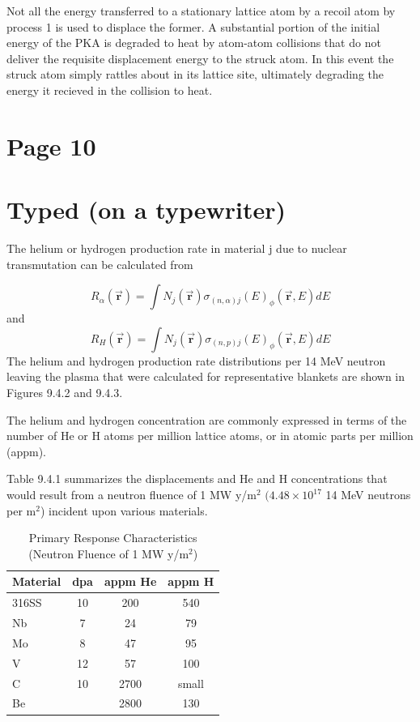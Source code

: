 \documentclass[11pt]{report} %
\begin{document}
Not all the energy transferred to a stationary lattice atom by a recoil atom by process 1 is used to displace the former. A substantial portion of the initial energy of the PKA is degraded to heat by atom-atom collisions that do not deliver the requisite displacement energy to the struck atom. In this event the struck atom simply rattles about in its lattice site, ultimately degrading the energy it recieved in the collision to heat.

\section{Page 10}

\section{Typed (on a typewriter)}

The helium or hydrogen production rate in material j due to nuclear transmutation can be calculated from

\begin{equation}
	R_{\alpha}(\vec{\mathbf{r}}) = \int N_j(\vec{\mathbf{r}}) \sigma_{(n,\alpha)j}(E)_{\phi}(\vec{\mathbf{r}},E) dE
\end{equation}
and
\begin{equation}
	R_{H}(\vec{\mathbf{r}}) = \int N_j(\vec{\mathbf{r}}) \sigma_{(n,p)j}(E)_{\phi}(\vec{\mathbf{r}},E) dE
\end{equation}
The helium and hydrogen production rate distributions per 14 MeV neutron leaving the plasma that were calculated for representative blankets are shown in Figures 9.4.2 and 9.4.3.

The helium and hydrogen concentration are commonly expressed in terms of the number of He or H atoms per million lattice atoms, or in atomic parts per million (appm).

Table 9.4.1 summarizes the displacements and He and H concentrations that would result from a neutron fluence of 1 MW y/m$^2$ $(4.48\times 10^{17}$ 14 MeV neutrons per m$^2$) incident upon various materials.
\begin{table}
\centering
\begin{tabular}{|lccc|}
\hline
Material & dpa & appm He & appm H \\
\hline
316SS & 10 & 200  & 540   \\
Nb    & 7  & 24   & 79    \\
Mo    & 8  & 47   & 95    \\
V     & 12 & 57   & 100   \\
C     & 10 & 2700 & small \\
Be    &    & 2800 & 130   \\
\hline
\end{tabular}
\caption{Primary Response Characteristics (Neutron Fluence of 1 MW y/m$^2$)}
\end{table}
\end{document}
